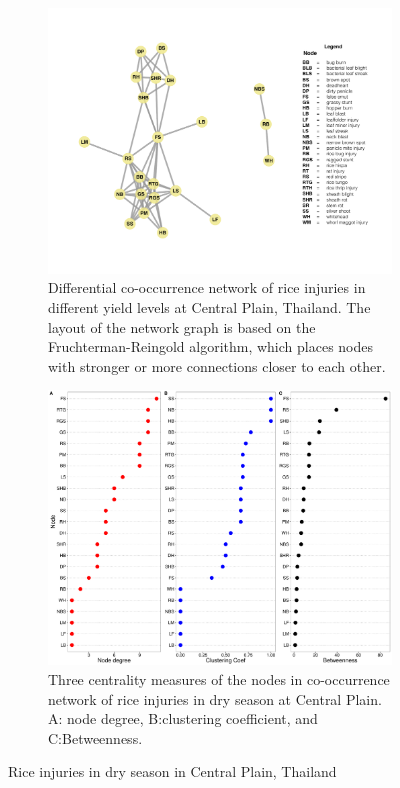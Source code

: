 \begin{figure}
    \centering
    \begin{subfigure}[b]{1\textwidth}
        \includegraphics[width = 1\textwidth]{figures/difyieldWJ.pdf}
        \caption{Differential co-occurrence network of rice injuries in different yield levels at Central Plain, Thailand. The layout of the network graph is based on the Fruchterman-Reingold algorithm, which places nodes with stronger or more connections closer to each other.}
        \label{fig:networkCP_ds}
    \end{subfigure}
    \begin{subfigure}[b]{1\textwidth}
        \includegraphics[width = 1\textwidth]{figures/yield_dif_nodepropWest_Java.pdf}
        \caption{Three centrality measures of the nodes in co-occurrence network of rice injuries in dry season at Central Plain. A: node degree, B:clustering coefficient, and C:Betweenness.}
        \label{fig:nodepropCP_ds}
    \end{subfigure}
    \caption{Rice injuries in dry season in Central Plain, Thailand}
    \label{fig:CP_ds}
\end{figure}
 